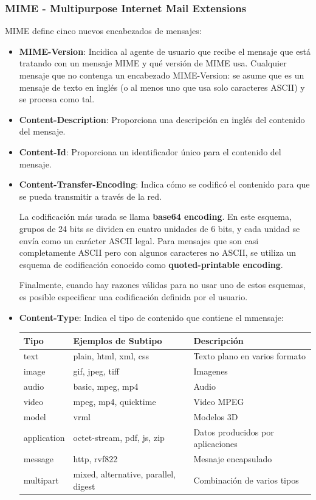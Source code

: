 \newpage
\subsubsection{MIME - Multipurpose Internet Mail Extensions}
MIME define cinco nuevos encabezados de mensajes:
\begin{itemize}
  \item \textbf{MIME-Version}: Incidica al agente de usuario que recibe el mensaje que está tratando con un mensaje MIME y qué versión de MIME usa. Cualquier mensaje que no contenga un encabezado MIME-Version: se asume que es un mensaje de texto en inglés (o al menos uno que usa solo caracteres ASCII) y se procesa como tal.
  \item \textbf{Content-Description}: Proporciona una descripción en inglés del contenido del mensaje.
  \item \textbf{Content-Id}: Proporciona un identificador único para el contenido del mensaje.
  \item \textbf{Content-Transfer-Encoding}: Indica cómo se codificó el contenido para que se pueda transmitir a través de la red. 
  
  La codificación más usada se llama \textbf{base64 encoding}. En este esquema, grupos de 24 bits se dividen en cuatro unidades de 6 bits, y cada unidad se envía como un carácter ASCII legal. Para mensajes que son casi completamente ASCII pero con algunos caracteres no ASCII, se utiliza un esquema de codificación conocido como \textbf{quoted-printable encoding}.

  Finalmente, cuando hay razones válidas para no usar uno de estos esquemas, es posible especificar una codificación definida por el usuario.
  
  \item \textbf{Content-Type}: Indica el tipo de contenido que contiene el mmensaje:
  \begin{center}
    \begin{tabularx}{0.8\textwidth}{l|l|l}
      \textbf{Tipo} & \textbf{Ejemplos de Subtipo} & \textbf{Descripción} \\
      \hline
      text & plain, html, xml, css & Texto plano en varios formato \\
      image & gif, jpeg, tiff & Imagenes \\
      audio & basic, mpeg, mp4 & Audio \\
      video & mpeg, mp4, quicktime & Video MPEG \\
      model & vrml & Modelos 3D \\
      application & octet-stream, pdf, js, zip & Datos producidos por aplicaciones \\
      message & http, rvf822 & Mesnaje encapsulado \\
      multipart & mixed, alternative, parallel, digest & Combinación de varios tipos \\
    \end{tabularx} 
  \end{center}
\end{itemize}

